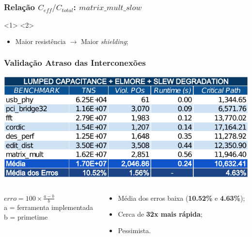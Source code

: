\documentclass[10pt,a4paper]{beamer}
\begin{document}
		\begin{frame}
			\frametitle{Relação $C_{eff} / C_{total}$: $matrix\_mult\_slow$}
			\begin{center}
				<1>
				<2>
			\end{center}
			
			{
				\begin{itemize}
					\item Maior resistência $\to$ Maior \textit{shielding};
				\end{itemize}
			}
		\end{frame}

		\begin{frame}[t]
			\frametitle{Validação Atraso das Interconexões}
			\begin{center}
				\includegraphics[width=\linewidth]{img/lump_elmore_slew.pdf}
			\end{center}
			\begin{columns}
				\begin{column}{0.4\textwidth}
					\begin{shaded}
						$erro = 100 \times \frac{a - b}{ b } $ \\
						\small{a = ferramenta implementada} \\
						\small{b = primetime}
					\end{shaded}
				\end{column}
				\begin{column}{0.6\textwidth}
					\begin{itemize}
						\item Média dos erros baixa (\textbf{10.52\%} e \textbf{4.63\%});
						\item Cerca de \textbf{32x mais rápida};
						\item Pessimista.
					\end{itemize}
				\end{column}
			\end{columns}			
			
		\end{frame}
		
\end{document}
